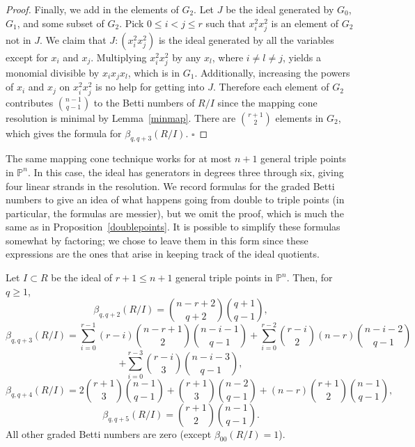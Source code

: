 \documentclass{article}
\begin{document}
\begin{proof}
Finally, we add in the elements of $G_2$. Let $J$ be the ideal generated by $G_0$, $G_1$, and some subset of $G_2$. Pick $0 \le i < j \le r$ such that $x_i^2x_j^2$ is an element of $G_2$ not in $J$. We claim that $J:(x_i^2x_j^2)$ is the ideal generated by all the variables except for $x_i$ and $x_j$. Multiplying $x_i^2x_j^2$ by any $x_l$, where $i \not = l \not = j$, yields a monomial divisible by $x_ix_jx_l$, which is in $G_1$. Additionally, increasing the powers of $x_i$ and $x_j$ on $x_i^2x_j^2$ is no help for getting into $J$. Therefore each element of $G_2$ contributes ${n-1 \choose q-1}$ to the Betti numbers of $R/I$ since the mapping cone resolution is minimal by Lemma~\ref{minmap}. There are ${r+1 \choose 2}$ elements in $G_2$, which gives the formula for $\beta_{q,q+3}(R/I)$. \hfill $\square$
\end{proof}

The same mapping cone technique works for at most $n+1$ general triple points in $\mathbb P^n$. In this case, the ideal has generators in degrees three through six, giving four linear strands in the resolution. We record formulas for the graded Betti numbers to give an idea of what happens going from double to triple points (in particular, the formulas are messier), but we omit the proof, which is much the same as in Proposition~\ref{doublepoints}. It is possible to simplify these formulas somewhat by factoring; we chose to leave them in this form since these expressions are the ones that arise in keeping track of the ideal quotients.

\begin{proposition}
\label{triplepoints}
Let $I \subset R$ be the ideal of $r+1 \le n+1$ general triple points in $\mathbb P^n$. Then, for $q \ge 1$, \[ \beta_{q,q+2}(R/I) = {n-r+2 \choose q+2}{q+1 \choose q-1}, \] \[ \beta_{q,q+3}(R/I) = \sum_{i=0}^{r-1} \left (r-i \right ){n-r+1 \choose 2}{n-i-1 \choose q-1} + \sum_{i=0}^{r-2} {r-i \choose 2} \left (n-r \right ){n-i-2 \choose q-1} \] \[ + \sum_{i=0}^{r-3} {r-i \choose 3}{n-i-3 \choose q-1}, \] \[ \beta_{q,q+4}(R/I)=2{r+1 \choose 3}{n-1 \choose q-1} + {r+1 \choose 3}{n-2 \choose q-1}+(n-r){r+1 \choose 2}{n-1 \choose q-1}, \] \[ \beta_{q,q+5}(R/I)={r+1 \choose 2}{n-1 \choose q-1}. \] All other graded Betti numbers are zero (except $\beta_{00}(R/I)=1$).
\end{proposition}
\end{document}
